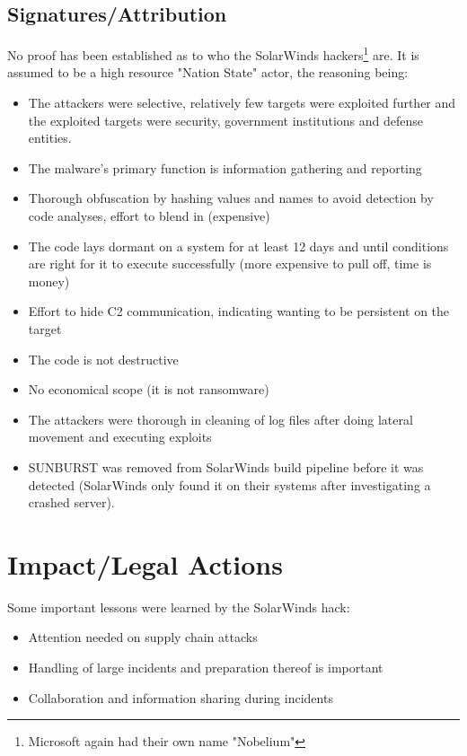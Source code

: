 \documentclass[
	letterpaper, %
	10pt, %
	unnumberedsections, %
	twoside, %
]{LTJournalArticle}
\begin{document}
\subsection{Signatures/Attribution}
No proof has been established as to who the SolarWinds hackers\footnote{Microsoft again had their own name "Nobelium"} are.
It is assumed to be a high resource "Nation State" actor, the reasoning being:
\begin{itemize}
	\item The attackers were selective, relatively few targets were exploited further and the exploited targets were security, government institutions and defense entities.
	\item The malware's primary function is information gathering and reporting
	\item Thorough obfuscation by hashing values and names to avoid detection by code analyses, effort to blend in (expensive)   
	\item The code lays dormant on a system for at least 12 days and until conditions are right for it to execute successfully (more expensive to pull off, time is money)
	\item Effort to hide C2 communication, indicating wanting to be persistent on the target
	\item The code is not destructive
	\item No economical scope (it is not ransomware)
	\item The attackers were thorough in cleaning of log files after doing lateral movement and executing exploits 
	\item SUNBURST was removed from SolarWinds build pipeline before it was detected (SolarWinds only found it on their systems after investigating a crashed server).
	
\end{itemize} 


\section{Impact/Legal Actions} 
Some important lessons were learned by the SolarWinds hack:
\begin{itemize}
	\item Attention needed on supply chain attacks
	\item Handling of large incidents and preparation thereof is important
	\item Collaboration and information sharing during incidents
\end{itemize} 
\end{document}

